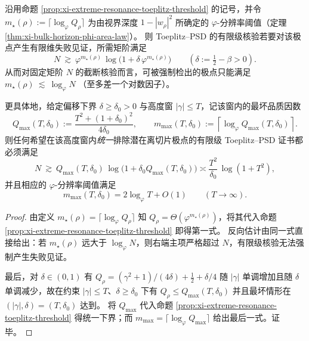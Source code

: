 \begin{corollary}\label{cor:xi-toeplitz-height-phi-calibration}
沿用命题 \ref{prop:xi-extreme-resonance-toeplitz-threshold} 的记号，并令
\(
m_\star(\rho):=\lceil\log_{\varphi}Q_\rho\rceil
\)
为由视界深度 \(1-|w_\rho|^2\) 所确定的 \(\varphi\)-分辨率阈值（定理 \ref{thm:xi-bulk-horizon-phi-area-law}）。
则 Toeplitz--PSD 的有限级核验若要对该极点产生有限维失败见证，所需矩阶满足
\[
N\ \gtrsim\ \varphi^{m_\star(\rho)}\,\log\!\bigl(1+\delta\,\varphi^{m_\star(\rho)}\bigr)
\qquad(\delta:=\tfrac12-\beta>0).
\]
从而对固定矩阶 \(N\) 的截断核验而言，可被强制检出的极点只能满足
\(
m_\star(\rho)\ \lesssim\ \log_{\varphi}N
\)
（至多差一个对数因子）。
\par
更具体地，给定偏移下界 \(\delta\ge\delta_0>0\) 与高度窗 \(|\gamma|\le T\)，记该窗内的最坏品质因数
\[
Q_{\max}(T,\delta_0):=\frac{T^2+(1+\delta_0)^2}{4\delta_0},
\qquad
m_{\max}(T,\delta_0):=\left\lceil\log_{\varphi}Q_{\max}(T,\delta_0)\right\rceil.
\]
则任何希望在该高度窗内\emph{统一}排除潜在离切片极点的有限级 Toeplitz--PSD 证书都必须满足
\[
N\ \gtrsim\ Q_{\max}(T,\delta_0)\,\log\!\bigl(1+\delta_0 Q_{\max}(T,\delta_0)\bigr)
\asymp \frac{T^2}{\delta_0}\,\log(1+T^2),
\]
并且相应的 \(\varphi\)-分辨率阈值满足
\[
m_{\max}(T,\delta_0)=2\log_{\varphi}T+O(1)\qquad(T\to\infty).
\]
\end{corollary}
\begin{proof}
由定义 \(m_\star(\rho)=\lceil\log_{\varphi}Q_\rho\rceil\) 知 \(Q_\rho=\Theta(\varphi^{m_\star(\rho)})\)，将其代入命题 \ref{prop:xi-extreme-resonance-toeplitz-threshold} 即得第一式。
反向估计由同一式直接给出：若 \(m_\star(\rho)\) 远大于 \(\log_\varphi N\)，则右端主项严格超过 \(N\)，有限级核验无法强制产生失败见证。
\par
最后，对 \(\delta\in(0,1)\) 有
\(
Q_\rho=(\gamma^2+1)/(4\delta)+\tfrac12+\delta/4
\)
随 \(|\gamma|\) 单调增加且随 \(\delta\) 单调减少，故在约束 \(|\gamma|\le T\)、\(\delta\ge\delta_0\) 下有
\(
Q_\rho\le Q_{\max}(T,\delta_0)
\)
并且最坏情形在 \((|\gamma|,\delta)=(T,\delta_0)\) 达到。
将 \(Q_{\max}\) 代入命题 \ref{prop:xi-extreme-resonance-toeplitz-threshold} 得统一下界；而 \(m_{\max}=\lceil\log_\varphi Q_{\max}\rceil\) 给出最后一式。证毕。
\end{proof}

